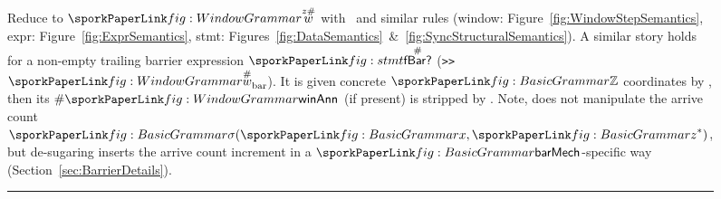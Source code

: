 \begin{figure}[h]
{Reduce to $\sporkwzH$ with \sporkDInstrStepParam\ and similar rules (window: Figure~\ref{fig:WindowStepSemantics}, expr: Figure~\ref{fig:ExprSemantics}, stmt: Figures~\ref{fig:DataSemantics}~\&~\ref{fig:SyncStructuralSemantics}).
A similar story holds for a non-empty trailing barrier expression $\sporkfBarH$ (\texttt{>>}$\sporkwH_\mathrm{bar}$).
It is given concrete $\sporkZ$ coordinates by \sporkDInstrStepBarrier,
then its $\#\sporkwinAnn$ (if present) is stripped by \sporkTrInstrBarrier.
Note, \sporkTrArriveRule{} does not manipulate the arrive count $\sporksigma(\sporkx, \sporkz^*)$,
but de-sugaring inserts the arrive count increment in a $\sporkbarMech$-specific way (Section~\ref{sec:BarrierDetails}).
}
\label{fig:SyncTraceSemantics}
\hrule
\end{figure}
